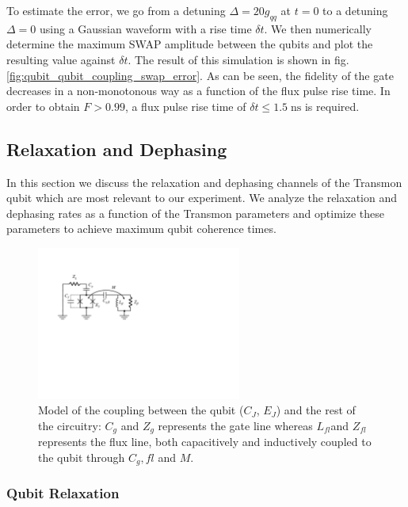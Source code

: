 To estimate the error, we go from a detuning $\Delta = 20 g_{qq}$ at $t=0$ to a detuning $\Delta=0$ using a Gaussian waveform with a rise time $\delta t$. We then numerically determine the maximum SWAP amplitude between the qubits and plot the resulting value against $\delta t$. The result of this simulation is shown in fig. \ref{fig:qubit_qubit_coupling_swap_error}. As can be seen, the fidelity of the gate decreases in a non-monotonous way as a function of the flux pulse rise time. In order to obtain $F>0.99$, a flux pulse rise time of $\delta t \le 1.5\;\mathrm{ns}$ is required.

\subsection{Relaxation and Dephasing}

In this section we discuss the relaxation and dephasing channels of the Transmon qubit which are most relevant to our experiment. We analyze the relaxation and dephasing rates as a function of the Transmon parameters and optimize these parameters to achieve maximum qubit coherence times.

\begin{figure}
	\centering
	\includegraphics[width=0.6\textwidth]{./material/figures/introduction/cooper_pair_box_decoherence}
	\caption[]{Model of the coupling between the qubit ($C_J$, $E_J$) and the rest of the circuitry: $C_g$ and $Z_g$ represents the gate line whereas $L_{fl}$and $Z_{fl}$ represents the flux line, both capacitively and inductively coupled to the qubit through $C_g,fl$ and $M$.}
	\label{fig:cooper_pair_box_decoherence}
\end{figure}

\subsubsection{Qubit Relaxation}

